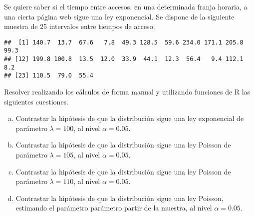 \documentclass[12pt]{article}\usepackage[]{graphicx}\usepackage[]{color}
\makeatletter
\newenvironment{kframe}{%
 \def\at@end@of@kframe{}%
 \ifinner\ifhmode%
  \def\at@end@of@kframe{\end{minipage}}%
  \begin{minipage}{\columnwidth}%
 \fi\fi%
 \def\FrameCommand##1{\hskip\@totalleftmargin \hskip-\fboxsep
 \colorbox{shadecolor}{##1}\hskip-\fboxsep
     \hskip-\linewidth \hskip-\@totalleftmargin \hskip\columnwidth}%
 \MakeFramed {\advance\hsize-\width
   \@totalleftmargin\z@ \linewidth\hsize
   \@setminipage}}%
 {\par\unskip\endMakeFramed%
 \at@end@of@kframe}
\newenvironment{knitrout}{}{} %
\makeatother
\begin{document}
\begin {prob} Se quiere saber si el tiempo entre accesos, en una determinada franja horaria, a  una cierta página web sigue una ley exponencial. Se dispone de la siguiente muestra de 25 intervalos entre tiempos de acceso:

\begin{knitrout}
\color{fgcolor}\begin{kframe}
\begin{alltt}
\hlkwb{=}\hlstd{(}\hlstd{,}\hlstd{,}\hlstd{,}\hlstd{,}\hlstd{,}\hlstd{,}\hlstd{,}\hlstd{,}\hlstd{,}\hlstd{,}\hlstd{,}\hlstd{,}
    \hlstd{,}\hlstd{,}\hlstd{,}\hlstd{,}\hlstd{,}\hlstd{,}\hlstd{,}\hlstd{,}\hlstd{,}\hlstd{,}\hlstd{,}\hlstd{,}\hlstd{)}
\end{alltt}
\begin{verbatim}
##  [1] 140.7  13.7  67.6   7.8  49.3 128.5  59.6 234.0 171.1 205.8  99.3
## [12] 199.8 100.8  13.5  12.0  33.9  44.1  12.3  56.4   9.4 112.1   8.2
## [23] 110.5  79.0  55.4
\end{verbatim}
\end{kframe}
\end{knitrout}

Resolver realizando los cálculos de forma manual y utilizando funciones de R las siguientes cuestiones.

\begin{enumerate}[a)]
\item  Contrastar la hipótesis de que la distribución  sigue una ley exponencial de parámetro $\lambda=100$, al nivel $\alpha=0.05$.
\item  Contrastar la hipótesis de que la distribución  sigue una ley Poisson de parámetro $\lambda=105$, al nivel $\alpha=0.05$.
\item  Contrastar la hipótesis de que la distribución  sigue una ley Poisson de parámetro $\lambda=110$, al nivel $\alpha=0.05$.
\item  Contrastar la hipótesis de que la distribución  sigue una ley Poisson, estimando el parámetro parámetro  partir de la muestra, al nivel $\alpha=0.05$.
\end{enumerate}
\end{prob}
\end{document}
